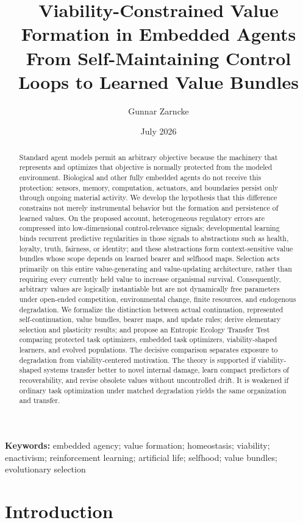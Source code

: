 \documentclass[11pt]{article}
\title{\textbf{Viability-Constrained Value Formation in Embedded Agents}\\
\large From Self-Maintaining Control Loops to Learned Value Bundles}
\author{Gunnar Zarncke}
\date{July 2026}
\begin{document}
\maketitle

\begin{abstract}
Standard agent models permit an arbitrary objective because the machinery that represents and optimizes that objective is normally protected from the modeled environment. Biological and other fully embedded agents do not receive this protection: sensors, memory, computation, actuators, and boundaries persist only through ongoing material activity. We develop the hypothesis that this difference constrains not merely instrumental behavior but the formation and persistence of learned values. On the proposed account, heterogeneous regulatory errors are compressed into low-dimensional control-relevance signals; developmental learning binds recurrent predictive regularities in those signals to abstractions such as health, loyalty, truth, fairness, or identity; and these abstractions form context-sensitive value bundles whose scope depends on learned bearer and selfhood maps. Selection acts primarily on this entire value-generating and value-updating architecture, rather than requiring every currently held value to increase organismal survival. Consequently, arbitrary values are logically instantiable but are not dynamically free parameters under open-ended competition, environmental change, finite resources, and endogenous degradation. We formalize the distinction between actual continuation, represented self-continuation, value bundles, bearer maps, and update rules; derive elementary selection and plasticity results; and propose an Entropic Ecology Transfer Test comparing protected task optimizers, embedded task optimizers, viability-shaped learners, and evolved populations. The decisive comparison separates exposure to degradation from viability-centered motivation. The theory is supported if viability-shaped systems transfer better to novel internal damage, learn compact predictors of recoverability, and revise obsolete values without uncontrolled drift. It is weakened if ordinary task optimization under matched degradation yields the same organization and transfer.
\end{abstract}

\noindent\textbf{Keywords:} embedded agency; value formation; homeostasis; viability; enactivism; reinforcement learning; artificial life; selfhood; value bundles; evolutionary selection

\section{Introduction}
\end{document}
